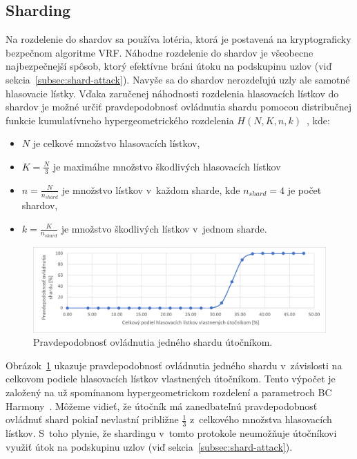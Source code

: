 \subsection{Sharding}\label{subsec:harmony-sharding-sec}
Na rozdelenie do shardov sa používa lotéria, ktorá je postavená na kryptograficky bezpečnom algoritme VRF. Náhodne rozdelenie do shardov je všeobecne najbezpečnejší spôsob, ktorý efektívne bráni útoku na podskupinu uzlov (viď sekcia~\ref{subsec:shard-attack}). Navyše sa do shardov nerozdeľujú uzly ale samotné hlasovacie lístky. Vďaka zaručenej náhodnosti rozdelenia hlasovacích lístkov do shardov je možné určiť pravdepodobnosť ovládnutia shardu pomocou distribučnej funkcie kumulatívneho hypergeometrického rozdelenia $H(N,K,n,k)$~\cite{rice2006mathematical, harmonyWp}, kde:
\begin{itemize}
	\item $N$ je celkové množstvo hlasovacích lístkov,
	\item $K = \frac{N}{3}$ je maximálne množstvo škodlivých hlasovacích lístkov
	\item $n = \frac{N}{n_{shard}}$ je množstvo lístkov v~každom sharde, kde $n_{shard} = 4$ je počet shardov,
	\item $k = \frac{K}{n_{shard}}$ je množstvo škodlivých lístkov v~jednom sharde.
\end{itemize}

\begin{figure}[bt]
	\centering
	\includegraphics[width=\textwidth]{obrazky-figures/hypergeom-dist}
	\caption{Pravdepodobnosť ovládnutia jedného shardu útočníkom.}
	\label{img:hypergeom-dist}
\end{figure}

Obrázok~\ref{img:hypergeom-dist} ukazuje pravdepodobnosť ovládnutia jedného shardu v~závislosti na celkovom podiele hlasovacích lístkov vlastnených útočníkom. Tento výpočet je založený na už spomínanom hypergeometrickom rozdelení a parametroch BC Harmony~\cite{harmonyWp}. Môžeme vidieť, že útočník má zanedbateľnú pravdepodobnosť ovládnuť shard pokiaľ nevlastní približne $\frac{1}{3}$ z~celkového množstva hlasovacích lístkov. S~toho plynie, že shardingu v~tomto protokole neumožňuje útočníkovi využiť útok na podskupinu uzlov (viď sekcia~\ref{subsec:shard-attack}).


